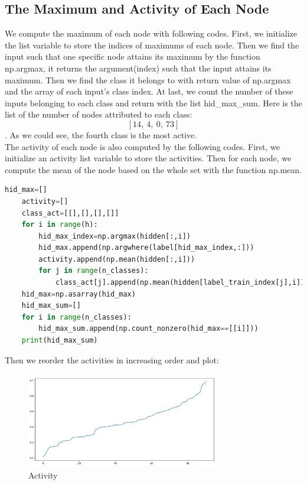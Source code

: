 \documentclass{article}
\begin{document}
  \subsection{The Maximum and Activity of Each Node}
  We compute the maximum of each node with following codes. First, we initialize the list variable to store the indices of maximums of each node. Then we find the input such that one specific node attains its maximum by the function np.argmax, it returns the argument(index) such that the input attains its maximum. Then we find the class it belongs to with return value of np.argmax and the array of each input's class index. At last, we count the number of these inputs belonging to each class and return with the list hid\_max\_sum. Here is the list of the number of nodes attributed to each class:\\ \[[14,\ 4,\ 0,\ 73]\]. As we could see, the fourth class is the most active.\\
  The activity of each node is also computed by the following codes. First, we initialize an activity list variable to store the activities. Then for each node, we compute the mean of the node based on the whole set with the function np.mean.
  \begin{lstlisting}[language=Python]
    hid_max=[]
    activity=[]
    class_act=[[],[],[],[]]
    for i in range(h):
        hid_max_index=np.argmax(hidden[:,i])
        hid_max.append(np.argwhere(label[hid_max_index,:]))
        activity.append(np.mean(hidden[:,i]))
        for j in range(n_classes):
            class_act[j].append(np.mean(hidden[label_train_index[j],i]))
    hid_max=np.asarray(hid_max)
    hid_max_sum=[]
    for i in range(n_classes):
        hid_max_sum.append(np.count_nonzero(hid_max==[[i]]))
    print(hid_max_sum)
  \end{lstlisting}
  Then we reorder the activities in increasing order and plot:
  \begin{figure}[H]
  \centering
  \includegraphics[width=0.75\textwidth]{activity.jpg}
  \caption{Activity}\label{}
  \end{figure}
\end{document}
